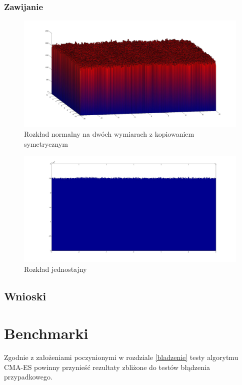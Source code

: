 \documentclass{mini}
\begin{document}
\subsubsection*{Zawijanie}

\begin{figure}[H]
\centering
\includegraphics[width=\textwidth]{w_n_10M_2__20_20__10_10_4_2}
\caption{Rozkład normalny na dwóch wymiarach z kopiowaniem symetrycznym}
\end{figure}

\begin{figure}[H]
\centering
\includegraphics[width=\textwidth]{w_j_20M_1__3_3}
\caption{Rozkład jednostajny}
\end{figure}

\subsection{Wnioski}

\pagebreak

\section{Benchmarki}
Zgodnie z założeniami poczynionymi w rozdziale \ref{bladzenie} testy algorytmu CMA-ES powinny przynieść rezultaty zbliżone do testów błądzenia przypadkowego.
\end{document}
